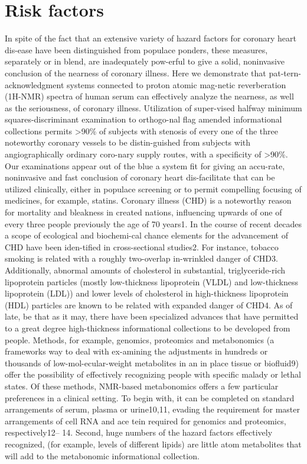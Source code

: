 \documentclass[sigconf]{acmart}
\begin{document}
\section{Risk factors}
\par In spite of the fact that an extensive variety of hazard factors for coronary heart dis-ease have been distinguished from populace ponders, these measures, separately or in blend, are inadequately pow-erful to give a solid, noninvasive conclusion of the nearness of coronary illness. Here we demonstrate that pat-tern-acknowledgment systems connected to proton atomic mag-netic reverberation (1H-NMR) spectra of human serum can effectively analyze the nearness, as well as the seriousness, of coronary illness. Utilization of super-vised halfway minimum squares-discriminant examination to orthogo-nal flag amended informational collections permits >90\% of subjects with stenosis of every one of the three noteworthy coronary vessels to be distin-guished from subjects with angiographically ordinary coro-nary supply routes, with a specificity of >90\%. Our examinations appear out of the blue a system fit for giving an accu-rate, noninvasive and fast conclusion of coronary heart dis-facilitate that can be utilized clinically, either in populace screening or to permit compelling focusing of medicines, for example, statins.
Coronary illness (CHD) is a noteworthy reason for mortality and bleakness in created nations, influencing upwards of one of every three people previously the age of 70 years1. In the course of recent decades a scope of ecological and biochemi-cal chance elements for the advancement of CHD have been iden-tified in cross-sectional studies2. For instance, tobacco smoking is related with a roughly two-overlap in-wrinkled danger of CHD3. Additionally, abnormal amounts of cholesterol in substantial, triglyceride-rich lipoprotein particles (mostly low-thickness lipoprotein (VLDL) and low-thickness lipoprotein (LDL)) and lower levels of cholesterol in high-thickness lipoprotein (HDL) particles are known to be related with expanded danger of CHD4.
As of late, be that as it may, there have been specialized advances that have permitted to a great degree high-thickness informational collections to be developed from people. Methods, for example, genomics, proteomics and metabonomics (a frameworks way to deal with ex-amining the adjustments in hundreds or thousands of low-mol-ecular-weight metabolites in an in place tissue or biofluid9) offer the possibility of effectively recognizing people with specific malady or lethal states. Of these methods, NMR-based metabonomics offers a few particular preferences in a clinical setting. To begin with, it can be completed on standard arrangements of serum, plasma or urine10,11, evading the requirement for master arrangements of cell RNA and ace tein required for genomics and proteomics, respectively12– 14. Second, huge numbers of the hazard factors effectively recognized, (for example, levels of different lipids) are little atom metabolites that will add to the metabonomic informational collection.
\end{document}

